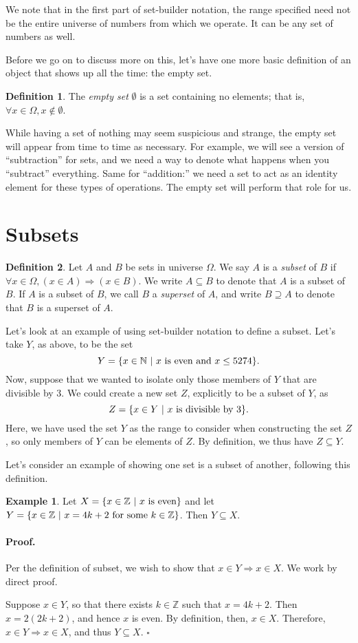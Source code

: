 \documentclass{article}
\theoremstyle{definition}
\newtheorem{example}{Example}
\newtheorem{definition}{Definition}
\renewenvironment{proof} {\paragraph{Proof.}}{\hfill$\square$}
\newcommand{\ra}{\Rightarrow}
\newcommand{\Z}{\mathbb{Z}}
\newcommand{\ex}[1]{\begin{examplebox}\begin{example} #1 \end{example}\end{examplebox}}
\newcommand{\N}{\mathbb{N}}
\begin{document}
We note that in the first part of set-builder notation, the range specified need not be the entire universe of numbers from which we operate. It can be any set of numbers as well. 

Before we go on to discuss more on this, let's have one more basic definition of an object that shows up all the time: the empty set.

\begin{definition}
The {\it empty set} $\emptyset$ is a set containing no elements; that is, $\forall x\in\Omega, x\notin \emptyset$.
\end{definition}
While having a set of nothing may seem suspicious and strange, the empty set will appear from time to time as necessary. For example, we will see a version of ``subtraction'' for sets, and we need a way to denote what happens when you ``subtract'' everything. Same for ``addition:'' we need a set to act as an identity element for these types of operations. The empty set will perform that role for us.

\section{Subsets}

\begin{definition}
Let $A$ and $B$ be sets in universe $\Omega$. We say $A$ is a {\it subset} of $B$ if $\forall x\in\Omega, (x\in A)\ra (x\in B)$. We write $A\subseteq B$ to denote that $A$ is a subset of $B$. If $A$ is a subset of $B$, we call $B$ a {\it superset} of $A$, and write $B\supseteq A$ to denote that $B$ is a superset of $A$.
\end{definition}

Let's look at an example of using set-builder notation to define a subset. Let's take $Y$, as above, to be the set 
\[ Y = \{x\in\N\ | \ x\hbox{ is even and }x\leq 5274\}.\]
Now, suppose that we wanted to isolate only those members of $Y$ that are divisible by 3. We could create a new set $Z$, explicitly to be a subset of $Y$, as 
\[ Z=\{x\in Y\ | \ x\hbox{ is divisible by 3}\}.\]
Here, we have used the set $Y$ as the range to consider when constructing the set $Z$, so only members of $Y$ can be elements of $Z$. By definition, we thus have $Z\subseteq Y$.

Let's consider an example of showing one set is a subset of another, following this definition.
\ex{Let $X=\{x\in\Z \ | \ x\hbox{ is even}\}$ and let $Y=\{x\in\Z\ | \ x=4k+2\hbox{ for some }k\in\Z\}$. Then $Y\subseteq X$.

\begin{proof}
Per the definition of subset, we wish to show that $x\in Y \ra x\in X$. We work by direct proof.

Suppose $x\in Y$, so that there exists $k\in\Z$ such that $x=4k+2$. Then $x=2(2k+2)$, and hence $x$ is even. By definition, then, $x\in X$. Therefore, $x\in Y\ra x\in X$, and thus $Y\subseteq X$. 
\end{proof}}
\end{document}
